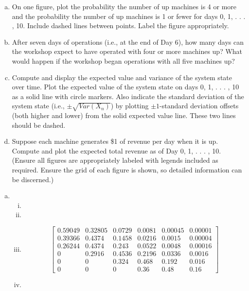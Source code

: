 \documentclass[answers]{exam}
\begin{document}
\begin{questions}
\begin{enumerate}[(a)]
	\item On one figure, plot the probability the number of up machines is 4 or more and the probability the number of up machines is 1 or fewer for days 0, 1, . . . , 10. Include dashed lines between points. Label the figure appropriately.
	
	\item After seven days of operations (i.e., at the end of Day 6), how many days can the workshop expect to have operated with four or more machines up? What would happen if the workshop began operations with all five machines up?
	
	\item Compute and display the expected value and variance of the system state over time. Plot the expected value of the system state on days 0, 1, . . . , 10 as a solid line with circle markers. Also indicate the standard deviation of the system state (i.e., \(\pm \sqrt{Var(X_n)}\)) by plotting \(\pm 1\)-standard deviation offsets (both higher and lower) from the solid expected value line. These two lines should be dashed.
	
	\item Suppose each machine generates \$1 of revenue per day when it is up. Compute and plot the expected total revenue as of Day 0, 1, . . . , 10.
	(Ensure all figures are appropriately labeled with legends included as required. Ensure the grid of each figure is shown, so detailed information can be discerned.)

\end{enumerate}
\begin{solution}
	\begin{enumerate}[(a)]
		\item 
		\begin{enumerate}[i.]
			\item 
			\item 
			\item 
			\[\begin{bmatrix}
				0.59049 & 0.32805 & 0.0729 & 0.0081 & 0.00045 & 0.00001 \\
				0.39366 & 0.4374  & 0.1458 & 0.0216 & 0.0015  & 0.00004 \\
				0.26244 & 0.4374  & 0.243  & 0.0522 & 0.0048  & 0.00016 \\
				0       & 0.2916  & 0.4536 & 0.2196 & 0.0336  & 0.0016  \\
				0       & 0       & 0.324  & 0.468  & 0.192   & 0.016   \\
				0       & 0       & 0      & 0.36   & 0.48    & 0.16    
			\end{bmatrix}\]
			\item 
		\end{enumerate}
	\end{enumerate}
\end{solution}



\end{questions}
\end{document}
